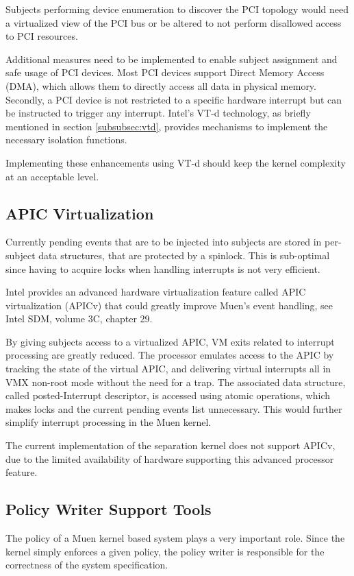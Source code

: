 Subjects performing device enumeration to discover the PCI topology would need
a virtualized view of the PCI bus or be altered to not perform disallowed access
to PCI resources.

Additional measures need to be implemented to enable subject assignment and safe
usage of PCI devices. Most PCI devices support Direct Memory Access (DMA), which
allows them to directly access all data in physical memory. Secondly, a PCI
device is not restricted to a specific hardware interrupt but can be instructed
to trigger any interrupt. Intel's VT-d technology, as briefly mentioned in
section \ref{subsubsec:vtd}, provides mechanisms to implement the necessary
isolation functions.

Implementing these enhancements using VT-d should keep the kernel complexity at
an acceptable level.

\subsection{APIC Virtualization}\label{subsec:apicv}
Currently pending events that are to be injected into subjects are stored in
per-subject data structures, that are protected by a spinlock. This is
sub-optimal since having to acquire locks when handling interrupts is not very
efficient.

Intel provides an advanced hardware virtualization feature called APIC
virtualization (APICv) that could greatly improve Muen's event
handling, see Intel SDM, volume 3C, chapter 29.

By giving subjects access to a virtualized APIC, VM exits related to interrupt
processing are greatly reduced. The processor emulates access to the APIC by
tracking the state of the virtual APIC, and delivering virtual interrupts all in
VMX non-root mode without the need for a trap. The associated data structure,
called posted-Interrupt descriptor, is accessed using atomic operations, which
makes locks and the current pending events list unnecessary. This would further
simplify interrupt processing in the Muen kernel.

The current implementation of the separation kernel does not support APICv, due
to the limited availability of hardware supporting this advanced processor
feature.

\subsection{Policy Writer Support Tools}
The policy of a Muen kernel based system plays a very important role. Since the
kernel simply enforces a given policy, the policy writer is responsible for the
correctness of the system specification.

